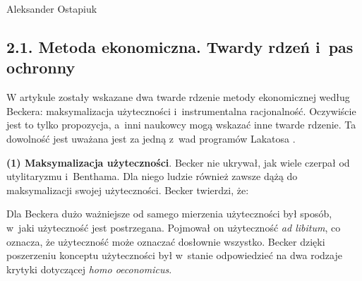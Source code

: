\begin{artplenv}{Aleksander Ostapiuk}
\subsection{2.1. Metoda ekonomiczna. Twardy rdzeń i~pas ochronny}
W artykule zostały wskazane dwa twarde rdzenie metody ekonomicznej według Beckera: maksymalizacja
użyteczności i~instrumentalna racjonalność. Oczywiście jest to tylko propozycja, a~inni naukowcy mogą wskazać
inne twarde rdzenie. Ta
dowolność jest uważana jest za jedną z~wad programów Lakatosa
\parencite{marchi_appraising_1991}.

\textbf{(1) Maksymalizacja użyteczności}. Becker nie ukrywał, jak wiele czerpał od utylitaryzmu i~Benthama. Dla
niego ludzie również zawsze dążą do maksymalizacji swojej użyteczności. Becker twierdzi, że:


Dla Beckera dużo ważniejsze od samego mierzenia użyteczności był sposób, w~jaki użyteczność jest postrzegana. Pojmował
on użyteczność \textit{ad libitum}, co oznacza, że użyteczność może oznaczać dosłownie wszystko. Becker dzięki
poszerzeniu konceptu użyteczności był w~stanie odpowiedzieć na dwa rodzaje krytyki dotyczącej \textit{homo oeconomicus}.


\end{artplenv}
